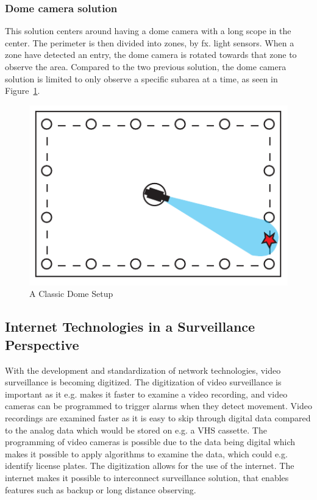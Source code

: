 \subsubsection{Dome camera solution}
This solution centers around having a dome camera with a long scope in the center.
The perimeter is then divided into zones, by fx. light sensors.
When a zone have detected an entry, the dome camera is rotated towards that zone to observe the area.
Compared to the two previous solution, the dome camera solution is limited to only observe a specific subarea at a time, as seen in Figure~\ref{fig:drone_sensor}.
\begin{figure}[htb]
    \centering
    \includegraphics[width=\textwidth]{gfx/drome_sensor.pdf}
    \caption{A Classic Dome Setup}
    \label{fig:drone_sensor}
\end{figure}



\subsection{Internet Technologies in a Surveillance Perspective}
With the development and standardization of network technologies, video surveillance is becoming digitized.
The digitization of video surveillance is important as it e.g. makes it faster to examine a video recording, and video cameras can be programmed to trigger alarms when they detect movement.
Video recordings are examined faster as it is easy to skip through digital data compared to the analog data which would be stored on e.g. a VHS cassette.
The programming of video cameras is possible due to the data being digital which makes it possible to apply algorithms to examine the data, which could e.g. identify license plates.
The digitization allows for the use of the internet. The internet makes it possible to interconnect surveillance solution, that enables features such as backup or long distance observing.








